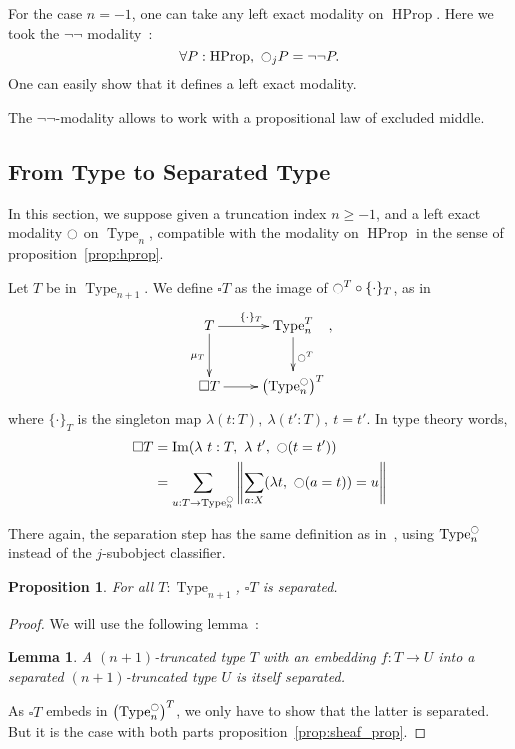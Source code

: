 \documentclass[conference]{IEEEtran}
\newtheorem{prop}[thm]{Proposition}
\newtheorem{lem}[thm]{Lemma}
\DeclareMathOperator{\Type}{Type}
\DeclareMathOperator{\HProp}{HProp}
\DeclareMathOperator{\im}{Im}
\newcommand{\modal}{\ensuremath{\ocircle}}
\begin{document}
For the case $n=-1$, one can take any left exact modality on
$\HProp$. Here we took the $\lnot\lnot$ modality~:
$$\forall P:\HProp,~\modal_j P = \lnot\lnot P.$$
One can easily show that it defines a left exact modality.

The $\lnot\lnot$-modality allows to work with a propositional law of
excluded middle. 

\subsection{From Type to Separated Type}
\label{ssec:from-type-separated}
In this section, we suppose given a truncation index $n\geqslant -1$,
and a left exact modality $\modal$ on $\Type_n$, compatible with the
modality on $\HProp$ in the sense of proposition~\ref{prop:hprop}.

Let $T$ be in $\Type_{n+1}$. We define $\square T$ as the image of
$\modal^T \circ \{\cdot\}_T$, as in
$$\xymatrix{
  T \ar[r]^{\{\cdot\}_T} \ar[d]_{\mu_T} & \Type_n^T \ar[d]^{\modal^T} \\
  \square T \ar[r]& \left( \Type_n^\modal \right)^T
}, $$
where $\{\cdot\}_T$ is the singleton map $\lambda (t:T),~\lambda
(t':T),~t=t'$.
In type theory words, 
\begin{align*}
\square T &= \im (\lambda~t:T,~\lambda~ t',~ \modal (t = t')) \\
          &= \sum_{u:T \to \Type_n^\modal} \left\| \sum_{a:X} 
            (\lambda t,~\modal (a=t)) = u\right\|
\end{align*}

There again, the separation step has the same definition as
in~\cite{maclanemoerdijk}, using $\Type_n^\modal$ instead of the
$j$-subobject classifier.

\begin{prop}
  For all $T:\Type_{n+1}$, $\square T$ is separated.  
\end{prop}

\begin{proof}
We will use the following lemma~:
\begin{lem}
  A $(n+1)$-truncated type $T$ with an embedding $f : T \to U$
  into a separated $(n+1)$-truncated type $U$ is itself separated.
\end{lem}
As $\square T$ embeds in $\left( \Type_n^\modal \right)^T$, we only
have to show that the latter is separated. But it is the case with
both parts proposition~\ref{prop:sheaf_prop}.
\end{proof}
\end{document}
